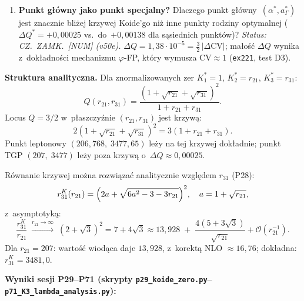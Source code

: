\begin{problem}
\begin{enumerate}[label=\textbf{OK-\arabic*}]
    \item \textbf{Punkt g\l{}\'owny jako punkt specjalny?}
          Dlaczego punkt g\l{}\'owny~$(\alpha^*,a_\Gamma^*)$ jest
          znacznie bli\.zej krzywej Koide'go ni\.z inne punkty
          rodziny optymalnej ($\Delta Q^* = +0{,}00025$ vs.\
          do~$+0{,}00138$ dla s\k{a}siednich punkt\'ow)?
          \textit{Status: CZ.~ZAMK.\ [NUM] (v50e).}
          $\Delta Q = 1{,}38 \cdot 10^{-5} = \tfrac{3}{2}\,|\Delta\mathrm{CV}|$;
          ma\l{}o\'s\'c $\Delta Q$ wynika z~dok\l{}adno\'sci
          mechanizmu $\varphi$-FP, kt\'ory wymusza $\mathrm{CV} \approx 1$
          (\texttt{ex221}, test D3).
\end{enumerate}

\textbf{Struktura analityczna.}
Dla znormalizowanych zer $K^*_1 = 1$, $K^*_2 = r_{21}$, $K^*_3 = r_{31}$:
\begin{equation}\label{eq:Q-r21-r31}
    Q(r_{21}, r_{31})
    = \frac{(1 + \sqrt{r_{21}} + \sqrt{r_{31}})^2}
           {1 + r_{21} + r_{31}}.
\end{equation}
Locus $Q = 3/2$ w~p\l{}aszczy\'znie $(r_{21}, r_{31})$ jest krzyw\k{a}:
\begin{equation}\label{eq:koide-locus}
    2(1 + \sqrt{r_{21}} + \sqrt{r_{31}})^2
    = 3(1 + r_{21} + r_{31}).
\end{equation}
Punkt leptonowy $(206{,}768,\; 3477{,}65)$ le\.zy na tej krzywej dok\l{}adnie;
punkt TGP $(207,\; 3477)$ le\.zy poza krzyw\k{a} o~$\Delta Q \approx 0{,}00025$.

R\'ownanie krzywej mo\.zna rozwi\k{a}za\'c analitycznie
wzgl\k{e}dem $r_{31}$ (P28):
\begin{equation}\label{eq:r31-koide}
    r_{31}^K(r_{21})
    = \Bigl(2a + \sqrt{6a^2 - 3 - 3r_{21}}\Bigr)^2,
    \quad a = 1 + \sqrt{r_{21}},
\end{equation}
z~asymptotyk\k{a}:
\begin{equation}\label{eq:r31-koide-asym}
    \frac{r_{31}^K}{r_{21}}
    \;\xrightarrow{r_{21}\to\infty}\;
    (2+\sqrt{3})^2 = 7 + 4\sqrt{3} \approx 13{,}928
    \;+\; \frac{4(5+3\sqrt{3})}{\sqrt{r_{21}}} + \mathcal{O}(r_{21}^{-1}).
\end{equation}
Dla $r_{21}=207$: warto\'s\'c wiod\k{a}ca daje $13{,}928$,
z~korekt\k{a} NLO $\approx 16{,}76$; dok\l{}adna: $r_{31}^K = 3481{,}0$.

\textbf{Wyniki sesji P29--P71 (skrypty \texttt{p29\_koide\_zero.py}--\texttt{p71\_K3\_lambda\_analysis.py}):}


\end{problem}
